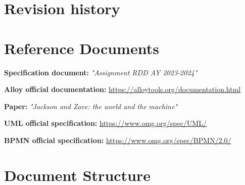 \section{Revision history}



\section{Reference Documents}

\begin{description}[labelwidth=4em, leftmargin=5em, style=nextline]
    \item \textbf{Specification document:} \emph{"Assignment RDD AY 2023-2024"}
    \item \textbf{Alloy official documentation:} \url{https://alloytools.org/documentation.html}
    \item \textbf{Paper:} \emph{"Jackson and Zave: the world and the machine"}
    \item \textbf{UML official specification:} \url{https://www.omg.org/spec/UML/}
    \item \textbf{BPMN official specification:} \url{https://www.omg.org/spec/BPMN/2.0/}
\end{description}


\section{Document Structure}